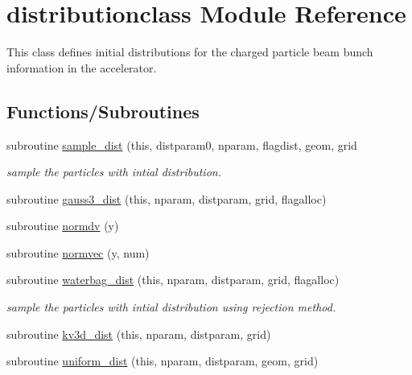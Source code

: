 \hypertarget{namespacedistributionclass}{}\section{distributionclass Module Reference}
\label{namespacedistributionclass}


This class defines initial distributions for the charged particle beam bunch information in the accelerator.  


\subsection*{Functions/\+Subroutines}
\begin{DoxyCompactItemize}
\item 
subroutine \mbox{\hyperlink{namespacedistributionclass_a90036cb4aa43f5e3f9844bc412d2a766}{sample\+\_\+dist}} (this, distparam0, nparam, flagdist, geom, grid
\begin{DoxyCompactList}\small\item\em sample the particles with intial distribution. \end{DoxyCompactList}\item 
subroutine \mbox{\hyperlink{namespacedistributionclass_af85f956a3fdb677022a546bc69ecfb3c}{gauss3\+\_\+dist}} (this, nparam, distparam, grid, flagalloc)
\item 
subroutine \mbox{\hyperlink{namespacedistributionclass_a00377c8aa90fa9dc8b222d71d019f936}{normdv}} (y)
\item 
subroutine \mbox{\hyperlink{namespacedistributionclass_acfc04ca0c8be3e0f3e73779c5e88693b}{normvec}} (y, num)
\item 
subroutine \mbox{\hyperlink{namespacedistributionclass_aed734df6d00f7004cf11847adb42dd1d}{waterbag\+\_\+dist}} (this, nparam, distparam, grid, flagalloc)
\begin{DoxyCompactList}\small\item\em sample the particles with intial distribution using rejection method. \end{DoxyCompactList}\item 
subroutine \mbox{\hyperlink{namespacedistributionclass_a2e96d2c85cac39531d37f2ce057c5766}{kv3d\+\_\+dist}} (this, nparam, distparam, grid)
\item 
subroutine \mbox{\hyperlink{namespacedistributionclass_a4a013e2bf1afc4cdeefe0fce7f0e0e00}{uniform\+\_\+dist}} (this, nparam, distparam, geom, grid)
\item 

\end{DoxyCompactItemize}
